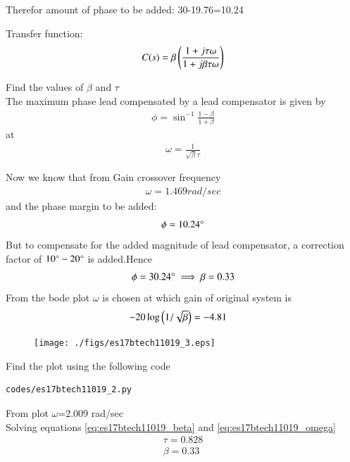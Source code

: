 \begin{enumerate}[label=\thesection.\arabic*.,ref=\thesection.\theenumi]
Therefor amount of phase to be added: 30-19.76=10.24

Transfer function:
\begin{align}
C(s)=\beta\left(\frac{1+j\tau\omega}{1+j\beta\tau\omega}\right)
\label{eq:es17btech11019_lead_compensator}
\end{align}

Find the values of $\beta$ and $\tau$\\
\solution The maximum phase lead compensated by a lead compensator is given by\\
\begin{align}
\phi={\sin}^{-1}\frac{1-\beta}{1+\beta}
\label{eq:es17btech11019_beta}
\end{align}
at
\begin{align}
\omega =\frac{1}{\sqrt{\beta}\tau}
\label{eq:es17btech11019_omega}
\end{align}

Now we know that from Gain crossover frequency
\begin{align}
\omega =1.469 rad/sec
\end{align}
and the phase margin to be added:
\begin{align}
\phi =10.24\degree
\end{align}
But to compensate for the added magnitude of lead compensator, a correction factor of $10\degree-20\degree$
is added.Hence
\begin{align}
\phi =30.24\degree
\implies \beta=0.33
\end{align}
From the bode plot $\omega$ is chosen at which gain of original system is
\begin{align}
-20\log\left(1/\sqrt{\beta}\right)&=-4.81
\end{align}
\begin{figure}[!ht]
  \centering
  \texttt{[image: ./figs/es17btech11019\_3.eps]}
  \caption{}
  \label{fig:es17btech11019_3}
\end{figure}
Find the plot using the following code
\begin{lstlisting}
codes/es17btech11019_2.py
\end{lstlisting}
From plot $\omega$=2.009 rad/sec\\
Solving equations \ref{eq:es17btech11019_beta} and \ref{eq:es17btech11019_omega}
\begin{align}
\tau= 0.828\\
\beta=0.33\\
\label{eq:es17btech11019_final}
\end{align}


\end{enumerate}
